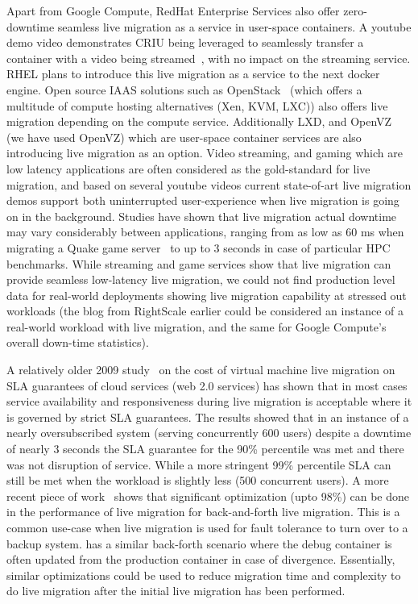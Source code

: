 Apart from Google Compute, RedHat Enterprise Services also offer zero-downtime seamless live migration as a service in user-space containers. A youtube demo video demonstrates CRIU being leveraged to seamlessly transfer a container with a video being streamed~\cite{criulive}, with no impact on the streaming service. RHEL plans to introduce this live migration as a service to the next docker engine.
Open source IAAS solutions such as OpenStack~\cite{openstack} (which offers a multitude of compute hosting alternatives (Xen, KVM, LXC)) also offers live migration depending on the compute service. Additionally LXD, and OpenVZ (we have used OpenVZ) which are user-space container services are also introducing live migration as an option. 
Video streaming, and gaming which are low latency applications are often considered as the gold-standard for live migration, and based on several youtube videos current state-of-art live migration demos support both uninterrupted user-experience when live migration is going on in the background. 
Studies have shown that live migration actual downtime may vary considerably between applications, ranging from as low as 60 ms when migrating a Quake game server~\cite{quakeGame} to up to 3 seconds in case of particular HPC benchmarks. 
While streaming and game services show that live migration can provide seamless low-latency live migration, we could not find production level data for real-world deployments showing live migration capability at stressed out workloads (the blog from RightScale earlier could be considered an instance of a real-world workload with live migration, and the same for Google Compute's overall down-time statistics).

A relatively older 2009 study~\cite{slacost} on the cost of virtual machine live migration on SLA guarantees of cloud services (web 2.0 services) has shown that in most cases service availability and responsiveness during live migration is acceptable where it is governed by strict SLA guarantees. The results showed that in an instance of a nearly oversubscribed system (serving concurrently 600 users) despite a downtime of nearly 3 seconds the SLA guarantee for the 90\% percentile was met and there was not disruption of service. While a more stringent 99\% percentile SLA can still be met when the workload is slightly less (500 concurrent users).
 A more recent piece of work~\cite{backforth} shows that significant optimization (upto 98\%) can be done in the performance of live migration for back-and-forth live migration. This is a common use-case when live migration is used for fault tolerance to turn over to a backup system. \parikshan has a similar back-forth scenario where the debug container is often updated from the production container in case of divergence. Essentially, similar optimizations could be used to reduce migration time and complexity to do live migration after the initial live migration has been performed. 

